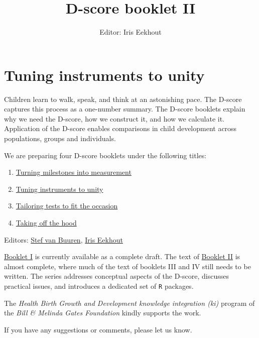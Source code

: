 \documentclass[
]{book}
\title{D-score booklet II}
\author{Editor: Iris Eekhout}
\date{}
\providecommand{\tightlist}{%
  \setlength{\itemsep}{0pt}\setlength{\parskip}{0pt}}
\begin{document}
\maketitle

{
\setcounter{tocdepth}{1}
\tableofcontents
}
\hypertarget{tuning-instruments-to-unity}{%
\chapter*{Tuning instruments to unity}\label{tuning-instruments-to-unity}}

Children learn to walk, speak, and think at an astonishing pace. The D-score captures this process as a one-number summary. The D-score booklets explain why we need the D-score, how we construct it, and how we calculate it. Application of the D-score enables comparisons in child development across populations, groups and individuals.

We are preparing four D-score booklets under the following titles:

\begin{enumerate}
\def\labelenumi{\Roman{enumi}.}
\tightlist
\item
  \href{https://d-score.org/dbook1}{Turning milestones into measurement}
\item
  \href{https://d-score.org/dbook2}{Tuning instruments to unity}
\item
  \href{https://stefvanbuuren.name/dbook3}{Tailoring tests to fit the occasion}
\item
  \href{https://stefvanbuuren.name/dbook4}{Taking off the hood}
\end{enumerate}

Editors: \href{https://stefvanbuuren.name}{Stef van Buuren}, \href{https://www.iriseekhout.com}{Iris Eekhout}

\href{https://d-score.org/dbook1}{Booklet I} is currently available as a complete draft. The text of \href{https://d-score.org/dbook2}{Booklet II} is almost complete, where much of the text of booklets III and IV still needs to be written. The series addresses conceptual aspects of the D-score, discusses practical issues, and introduces a dedicated set of \texttt{R} packages.

The \emph{Health Birth Growth and Development knowledge integration (ki)} program of the \emph{Bill \& Melinda Gates Foundation} kindly supports the work.

If you have any suggestions or comments, please let us know.
\end{document}

